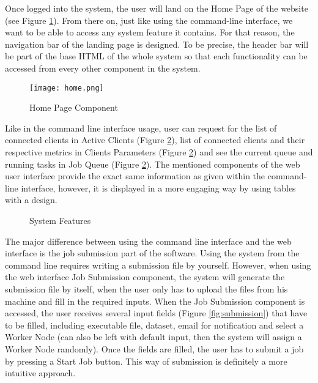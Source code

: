 \documentclass[10pt]{report}
\begin{document}
\noindent Once logged into the system, the user will land on the Home Page of the website (see Figure \ref{fig:home}). From there on, just like using the command-line interface, we want to be able to access any system feature it contains. For that reason, the navigation bar of the landing page is designed. To be precise, the header bar will be part of the base HTML of the whole system so that each functionality can be accessed from every other component in the system.
\newline

\begin{figure}[htp]
    \centering
    \texttt{[image: home.png]}
    \caption{Home Page Component}
    \label{fig:home}
\end{figure}

Like in the command line interface usage, user can request for the list of connected clients in Active Clients (Figure \ref{fig:features}), list of connected clients and their respective metrics in Clients Parameters (Figure \ref{fig:features}) and see the current queue and running tasks in Job Queue (Figure \ref{fig:features}). The mentioned components of the web user interface provide the exact same information as given within the command-line interface, however, it is displayed in a more engaging way by using tables with a design.
\newline

\begin{figure}[htbp]
    \centering
    \qquad
    \qquad
    \caption{System Features}
    \label{fig:features}
\end{figure}

The major difference between using the command line interface and the web interface is the job submission part of the software. Using the system from the command line requires writing a submission file by yourself. However, when using the web interface Job Submission component, the system will generate the submission file by itself, when the user only has to upload the files from his machine and fill in the required inputs. When the Job Submission component is accessed, the user receives several input fields (Figure \ref{fig:submission}) that have to be filled, including executable file, dataset, email for notification and select a Worker Node (can also be left with default input, then the system will assign a Worker Node randomly). Once the fields are filled, the user has to submit a job by pressing a Start Job button. This way of submission is definitely a more intuitive approach.
\newline
\end{document}
